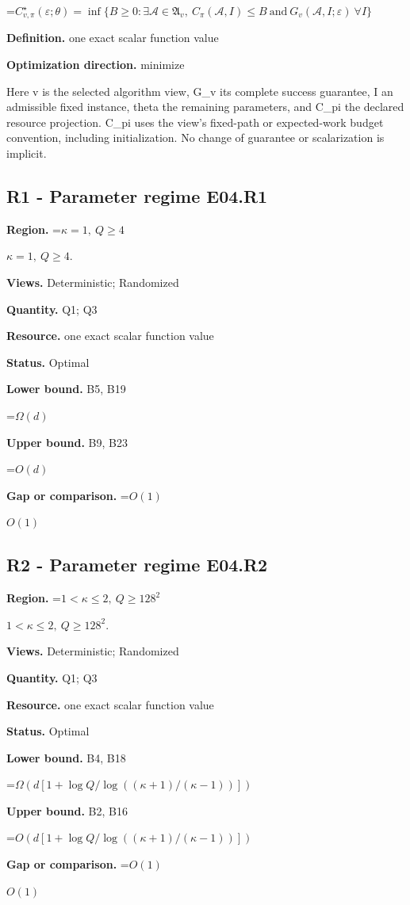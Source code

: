 \documentclass[10pt,a4paper]{article}
\newcommand{\AtlasMath}[1]{\par\begingroup\centering\setbox0=\hbox{$\displaystyle #1$}\ifdim\wd0>1.4\linewidth\typeout{ATLAS WIDE FORMULA: \the\wd0}\fi\ifdim\wd0>\linewidth\resizebox{\linewidth}{!}{\box0}\else\box0\fi\par\endgroup}
\newcommand{\AtlasInlineMath}[1]{\begingroup\setbox0=\hbox{$#1$}\ifdim\wd0>.4\linewidth\endgroup\AtlasMath{#1}\else\endgroup$#1$\fi}
\begin{document}
\AtlasMath{C^\star_{v,\pi}(\varepsilon;\theta)=\inf\{B\ge0:\exists\mathcal A\in\mathfrak A_v,\ C_\pi(\mathcal A,I)\le B\ \text{and}\ G_v(\mathcal A,I;\varepsilon)\ \forall I\}}
\textbf{Definition.} one exact scalar function value

\textbf{Optimization direction.} minimize

Here v is the selected algorithm view, G\_v its complete success guarantee, I an admissible fixed instance, theta the remaining parameters, and C\_pi the declared resource projection. C\_pi uses the view's fixed-path or expected-work budget convention, including initialization. No change of guarantee or scalarization is implicit.

\subsection{R1 - Parameter regime E04.R1}
\textbf{Region.} \AtlasInlineMath{\kappa=1,\ Q\ge4}.

\textbf{Views.} Deterministic; Randomized

\textbf{Quantity.} Q1; Q3

\textbf{Resource.} one exact scalar function value

\textbf{Status.} Optimal

\textbf{Lower bound.} B5, B19

\AtlasMath{\Omega(d)}
\textbf{Upper bound.} B9, B23

\AtlasMath{O(d)}
\textbf{Gap or comparison.} \AtlasInlineMath{O(1)}

\subsection{R2 - Parameter regime E04.R2}
\textbf{Region.} \AtlasInlineMath{1<\kappa\le2,\ Q\ge128^2}.

\textbf{Views.} Deterministic; Randomized

\textbf{Quantity.} Q1; Q3

\textbf{Resource.} one exact scalar function value

\textbf{Status.} Optimal

\textbf{Lower bound.} B4, B18

\AtlasMath{\Omega(d[1+\log Q/\log((\kappa+1)/(\kappa-1))])}
\textbf{Upper bound.} B2, B16

\AtlasMath{O(d[1+\log Q/\log((\kappa+1)/(\kappa-1))])}
\textbf{Gap or comparison.} \AtlasInlineMath{O(1)}
\end{document}

